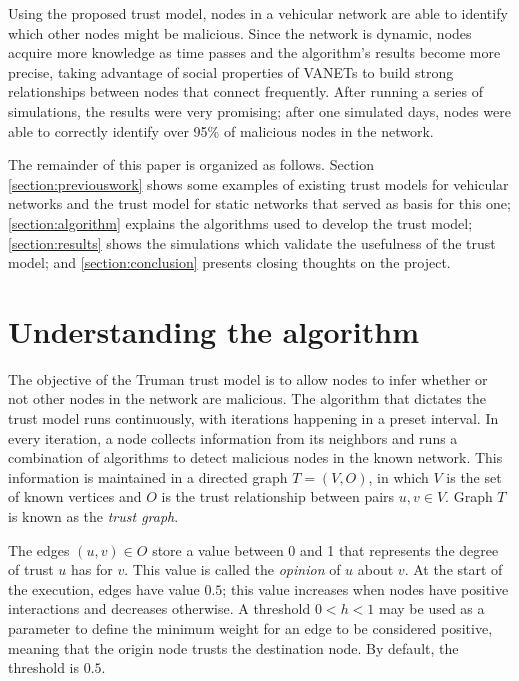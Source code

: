 \documentclass[conference]{IEEEtran}
\begin{document}
Using the proposed trust model, nodes in a vehicular network are able to identify which other nodes might be malicious.
Since the network is dynamic, nodes acquire more knowledge as time passes and the algorithm's results become more precise, taking advantage of social properties of VANETs \cite{da2013effective} \cite{cunha2014possible} to build strong relationships between nodes that connect frequently.
After running a series of simulations, the results were very promising; after one simulated days, nodes were able to correctly identify over 95\% of malicious nodes in the network.


The remainder of this paper is organized as follows.
Section \ref{section:previouswork} shows some examples of existing trust models for vehicular networks and the trust model for static networks that served as basis for this one;
\autoref{section:algorithm} explains the algorithms used to develop the trust model;
\autoref{section:results} shows the simulations which validate the usefulness of the trust model;
and \autoref{section:conclusion} presents closing thoughts on the project.

\section{Understanding the algorithm}
\label{section:algorithm}


The objective of the Truman trust model is to allow nodes to infer whether or not other nodes in the network are malicious.
The algorithm that dictates the trust model runs continuously, with iterations happening in a preset interval.
In every iteration, a node collects information from its neighbors and runs a combination of algorithms to detect malicious nodes in the known network.
This information is maintained in a directed graph $T=(V,O)$, in which $V$ is the set of known vertices and $O$ is the trust relationship between pairs $u,v \in V$.
Graph $T$ is known as the \textit{trust graph}.

The edges $(u, v) \in O$ store a value between 0 and 1 that represents the degree of trust $u$ has for $v$.
This value is called the \textit{opinion} of $u$ about $v$.
At the start of the execution, edges have value $0.5$; this value increases when nodes have positive interactions and decreases otherwise.
A threshold $0 < h < 1$ may be used as a parameter to define the minimum weight for an edge to be considered positive, meaning that the origin node trusts the destination node.
By default, the threshold is $0.5$.
\end{document}
